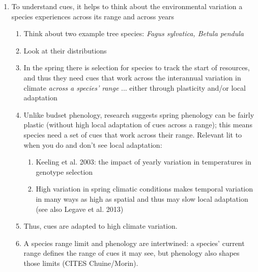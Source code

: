 \documentclass[11pt,letterpaper]{article}
\begin{document}
\begin{enumerate}
\begin{enumerate}
\end{enumerate}
\item To understand cues, it helps to think about the environmental variation a species experiences across its range and across years
\begin{enumerate}
\item Think about two example tree species: \emph{Fagus sylvatica, Betula pendula}
\item Look at their distributions
\item In the spring there is selection for species to track the start of resources, and thus they need cues that work across the interannual variation in climate \emph{across a species' range} ... either through plasticity and/or local adaptation
\item Unlike budset phenology, research suggests spring phenology can be fairly plastic (without high local adaptation of cues across a range); this means species need a set of cues that work across their range. Relevant lit to when you do and don't see local adaptation:
\begin{enumerate}
\item Keeling et al. 2003: the impact of yearly variation in temperatures in genotype selection
\item High variation in spring climatic conditions makes temporal variation in many ways as high as spatial and thus may slow local adaptation (see also Legave et al. 2013)
\end{enumerate}
\item Thus, cues are adapted to high climate variation.
\item A species range limit and phenology are intertwined: a species' current range defines the range of cues it may see, but phenology also shapes those limits (CITES Chuine/Morin).

\end{enumerate}
\end{enumerate}
\end{document}
